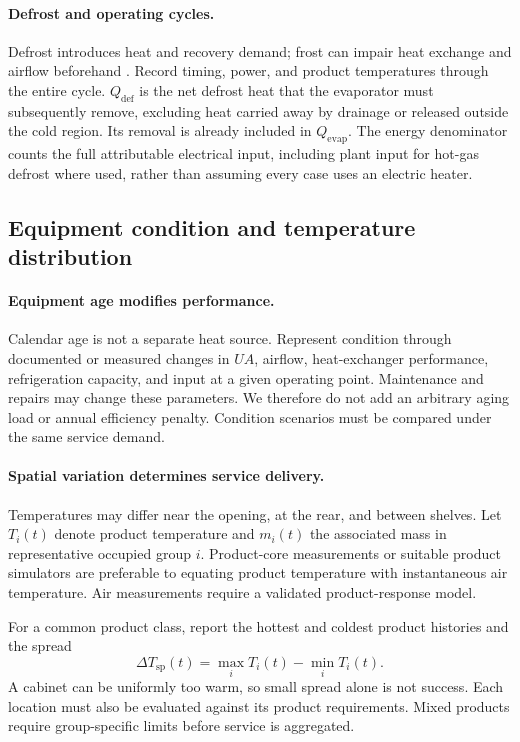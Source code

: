 \documentclass[12pt]{article}
\begin{document}
\paragraph{Defrost and operating cycles.}
Defrost introduces heat and recovery demand; frost can impair heat exchange and airflow beforehand \cite{ashrae}. Record timing, power, and product temperatures through the entire cycle. $Q_{\mathrm{def}}$ is the net defrost heat that the evaporator must subsequently remove, excluding heat carried away by drainage or released outside the cold region. Its removal is already included in $Q_{\mathrm{evap}}$. The energy denominator counts the full attributable electrical input, including plant input for hot-gas defrost where used, rather than assuming every case uses an electric heater.

\subsection{Equipment condition and temperature distribution}

\paragraph{Equipment age modifies performance.}
Calendar age is not a separate heat source. Represent condition through documented or measured changes in $UA$, airflow, heat-exchanger performance, refrigeration capacity, and input at a given operating point. Maintenance and repairs may change these parameters. We therefore do not add an arbitrary aging load or annual efficiency penalty. Condition scenarios must be compared under the same service demand.

\paragraph{Spatial variation determines service delivery.}
Temperatures may differ near the opening, at the rear, and between shelves. Let $T_i(t)$ denote product temperature and $m_i(t)$ the associated mass in representative occupied group $i$. Product-core measurements or suitable product simulators are preferable to equating product temperature with instantaneous air temperature. Air measurements require a validated product-response model.

For a common product class, report the hottest and coldest product histories and the spread
\begin{equation}
\Delta T_{\mathrm{sp}}(t)=\max_i T_i(t)-\min_i T_i(t).
\end{equation}
A cabinet can be uniformly too warm, so small spread alone is not success. Each location must also be evaluated against its product requirements. Mixed products require group-specific limits before service is aggregated.
\end{document}
